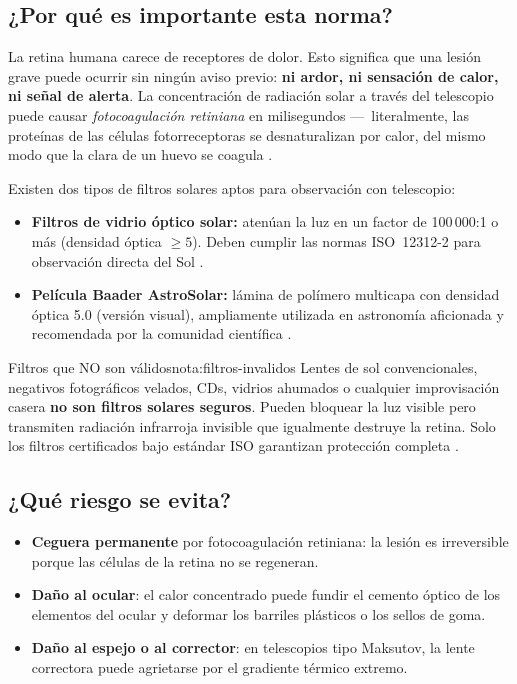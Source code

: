\documentclass[12pt,oneside]{book}
\begin{document}
\subsection{¿Por qué es importante esta norma?}

La retina humana carece de receptores de dolor. Esto significa que una lesión
grave puede ocurrir sin ningún aviso previo: \textbf{ni ardor, ni sensación de
calor, ni señal de alerta}. La concentración de radiación solar a través del
telescopio puede causar \emph{fotocoagulación retiniana} en milisegundos —~literalmente,
las proteínas de las células fotorreceptoras se desnaturalizan por calor, del mismo
modo que la clara de un huevo se coagula \cite{dobson2011}.

Existen dos tipos de filtros solares aptos para observación con telescopio:

\begin{itemize}[leftmargin=1.5em]
    \item \textbf{Filtros de vidrio óptico solar:} atenúan la luz en un factor
          de 100\,000:1 o más (densidad óptica $\geq 5$). Deben cumplir las normas
          ISO~12312-2 para observación directa del Sol \cite{iso12312}.
    \item \textbf{Película Baader AstroSolar:} lámina de polímero multicapa con
          densidad óptica 5.0 (versión visual), ampliamente utilizada en astronomía
          aficionada y recomendada por la comunidad científica \cite{baader2023}.
\end{itemize}

\begin{nota}{Filtros que NO son válidos}{nota:filtros-invalidos}
    Lentes de sol convencionales, negativos fotográficos velados, CDs, vidrios
    ahumados o cualquier improvisación casera \textbf{no son filtros solares seguros}.
    Pueden bloquear la luz visible pero transmiten radiación infrarroja invisible
    que igualmente destruye la retina. Solo los filtros certificados bajo estándar
    ISO garantizan protección completa \cite{pasachoff2000,iso12312}.
\end{nota}

\subsection{¿Qué riesgo se evita?}

\begin{itemize}[leftmargin=1.5em]
    \item \textbf{Ceguera permanente} por fotocoagulación retiniana: la lesión es
          irreversible porque las células de la retina no se regeneran.
    \item \textbf{Daño al ocular}: el calor concentrado puede fundir el cemento óptico
          de los elementos del ocular y deformar los barriles plásticos o los sellos de goma.
    \item \textbf{Daño al espejo o al corrector}: en telescopios tipo Maksutov, la
          lente correctora puede agrietarse por el gradiente térmico extremo.
\end{itemize}
\end{document}

